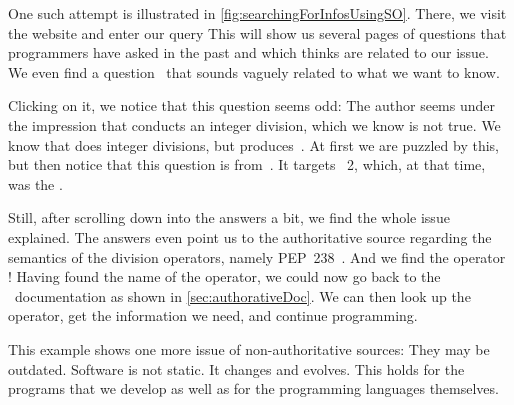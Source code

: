 One such attempt is illustrated in \cref{fig:searchingForInfosUsingSO}.
There, we visit the  website and enter our query \emph{}
This will show us several pages of questions that programmers have asked in the past and which  thinks are related to our issue.
We even find a question~\cite{SE:SO:HTIDWRTIIP} that sounds vaguely related to what we want to know.

Clicking on it, we notice that this question seems odd:
The author seems under the impression that \pythonilIdx{/} conducts an integer division, which we know is not true.
We know that \pythonilIdx{//} does integer divisions, but \pythonilIdx{/} produces~.
At first we are puzzled by this, but then notice that this question is from~\citeyear{SE:SO:HTIDWRTIIP}.
It targets \python~2, which, at that time, was the  \python.

Still, after scrolling down into the answers a bit, we find the whole issue explained.
The answers even point us to the authoritative source regarding the semantics of the division operators, namely PEP~238~\cite{PEP238}.
And we find the operator !
Having found the name of the operator, we could now go back to the \python\ documentation as shown in \cref{sec:authorativeDoc}.
We can then look up the operator, get the information we need, and continue programming.

This example shows one more issue of non-authoritative sources:
They may be outdated.
Software is not static.
It changes and evolves.
This holds for the programs that we develop as well as for the programming languages themselves.

